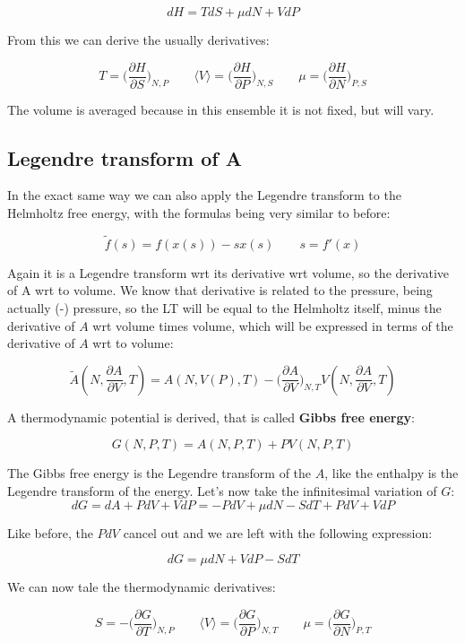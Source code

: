 	$$dH = TdS + \mu dN + VdP$$

From this we can derive the usually derivatives:

	$$T = \biggl(\frac{\partial H}{\partial S}\biggr)_{N, P} \qquad \langle V\rangle = \biggl(\frac{\partial H}{\partial P}\biggr)_{N, S} \qquad \mu = \biggl(\frac{\partial H}{\partial N}\biggr)_{P, S}$$
	
	The volume is averaged because in this ensemble it is not fixed, but will vary. 

	\subsection{Legendre transform of A}
	 In the exact same way we can also apply the Legendre transform to the Helmholtz free energy, with the formulas being very similar to before: 

	$$\tilde{f}(s) = f(x(s))-sx(s)\qquad s = f'(x)$$
	
	Again it is a Legendre transform wrt its derivative wrt volume, so the derivative of A wrt to volume. We know that derivative is related to the pressure, being actually (-) pressure, so the LT will be equal to the Helmholtz itself, minus the derivative of $A$ wrt volume times volume, which will be expressed in terms of the derivative of $A$ wrt to volume:

	$$\tilde{A}(N, \frac{\partial A}{\partial V}, T) = A(N, V(P), T)- \biggl(\frac{\partial A}{\partial V}\biggr)_{N, T}V(N, \frac{\partial A}{\partial V}, T)$$
	
	A thermodynamic potential is derived, that is called \textbf{Gibbs free energy}:

	$$G(N, P, T) = A(N, P, T) + PV(N, P, T)$$

	The Gibbs free energy is the Legendre transform of the $A$, like the enthalpy is the Legendre transform of the energy. 
	Let's now take the infinitesimal variation of $G$: 
	$$dG = dA + PdV + VdP = -PdV + \mu dN - SdT + PdV + VdP$$
	
	Like before, the $PdV$ cancel out and we are left with the following expression:

	$$dG = \mu dN + VdP - SdT$$
	
	We can now tale the thermodynamic derivatives:

	$$S = -\biggl(\frac{\partial G}{\partial T}\biggr)_{N, P}\qquad\langle V\rangle = \biggl(\frac{\partial G}{\partial P}\biggr)_{N, T}\qquad \mu = \biggl(\frac{\partial G}{\partial N}\biggr)_{P, T}$$
	
